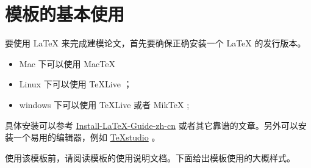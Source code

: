 \documentclass[withoutpreface,bwprint]{cumcmthesis} %
\begin{document}


\section{模板的基本使用}

要使用 \LaTeX{} 来完成建模论文，首先要确保正确安装一个 \LaTeX{} 的发行版本。

\begin{itemize}
    \item Mac 下可以使用 Mac\TeX{}
    \item Linux 下可以使用 \TeX{}Live ；
    \item windows 下可以使用 \TeX{}Live 或者 Mik\TeX{} ;
\end{itemize}

具体安装可以参考 \href{https://github.com/OsbertWang/install-latex-guide-zh-cn/releases/}{Install-LaTeX-Guide-zh-cn} 或者其它靠谱的文章。另外可以安装一个易用的编辑器，例如 \href{https://mirrors.tuna.tsinghua.edu.cn/github-release/texstudio-org/texstudio/LatestRelease/}{\TeX{}studio} 。

使用该模板前，请阅读模板的使用说明文档。下面给出模板使用的大概样式。
\end{document}

